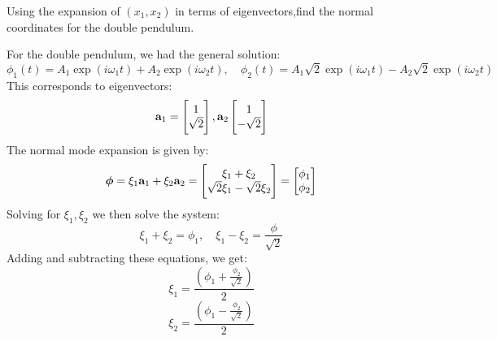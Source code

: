 \documentclass[../PHYS306Notes.tex]{subfiles}
\begin{document}
\begin{p}
Using the expansion of $(x_1, x_2)$ in terms of eigenvectors,find the normal coordinates for the double pendulum.
\end{p}
\begin{s}
For the double pendulum, we had the general solution:
\[\phi_1(t) = A_1\exp(i\omega_1 t) + A_2\exp(i\omega_2 t), \quad \phi_2(t) = A_1\sqrt{2}\exp(i\omega_1 t) - A_2\sqrt{2}\exp(i\omega_2 t)\]
This corresponds to eigenvectors:
\[\mathbf{a}_1 = \begin{bmatrix}1 \\ \sqrt{2}\end{bmatrix}, \mathbf{a}_2 \begin{bmatrix}1 \\ -\sqrt{2}\end{bmatrix}\]
The normal mode expansion is given by:
\[\bm{\phi} = \xi_1\mathbf{a}_1 + \xi_2\mathbf{a}_2 = \begin{bmatrix}\xi_1 + \xi_2 \\ \sqrt{2}\xi_1 - \sqrt{2}\xi_2\end{bmatrix} = \begin{bmatrix}\phi_1 \\ \phi_2\end{bmatrix}\]
Solving for $\xi_1, \xi_2$ we then solve the system:
\[\xi_1 + \xi_2 = \phi_1, \quad \xi_1 - \xi_2 = \frac{\phi}{\sqrt{2}}\]
Adding and subtracting these equations, we get:
\[\xi_1 = \frac{\left(\phi_1 + \frac{\phi_2}{\sqrt{2}}\right)}{2}\]
\[\xi_2 = \frac{\left(\phi_1 - \frac{\phi_2}{\sqrt{2}}\right)}{2}\]

\end{s}
\end{document}
